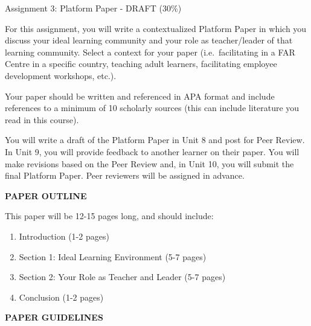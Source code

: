 \documentclass[
]{book}
\providecommand{\tightlist}{%
  \setlength{\itemsep}{0pt}\setlength{\parskip}{0pt}}
\begin{document}
\begin{assessment}
{Assignment 3: Platform Paper - DRAFT (30\%)}

For this assignment, you will write a contextualized Platform Paper in which you discuss your ideal learning community and your role as teacher/leader of that learning community. Select a context for your paper (i.e.~facilitating in a FAR Centre in a specific country, teaching adult learners, facilitating employee development workshops, etc.).

Your paper should be written and referenced in APA format and include references to a minimum of 10 scholarly sources (this can include literature you read in this course).

You will write a draft of the Platform Paper in Unit 8 and post for Peer Review. In Unit 9, you will provide feedback to another learner on their paper. You will make revisions based on the Peer Review and, in Unit 10, you will submit the final Platform Paper. Peer reviewers will be assigned in advance.

\textbf{PAPER OUTLINE}

This paper will be 12-15 pages long, and should include:

\begin{enumerate}
\def\labelenumi{\arabic{enumi}.}
\tightlist
\item
  Introduction (1-2 pages)\\
\item
  Section 1: Ideal Learning Environment (5-7 pages)\\
\item
  Section 2: Your Role as Teacher and Leader (5-7 pages)\\
\item
  Conclusion (1-2 pages)
\end{enumerate}

\textbf{PAPER GUIDELINES}


\end{assessment}
\end{document}
